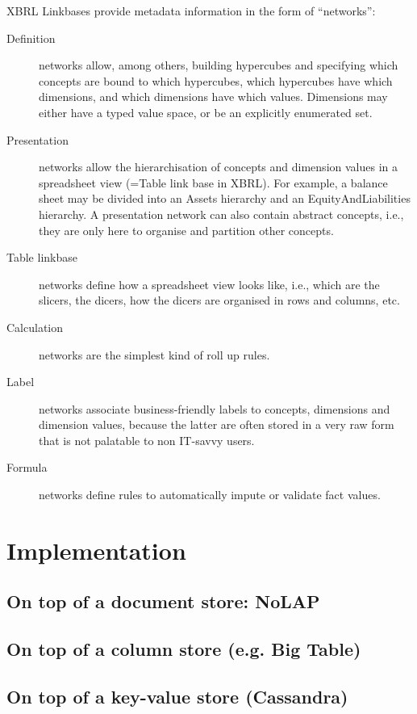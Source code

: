 \documentclass{vldb}
\begin{document}
XBRL Linkbases provide metadata information in the form of ``networks'':

\begin{description}
\item[Definition] networks allow, among others, building hypercubes and specifying which concepts are bound to which hypercubes, which hypercubes have which dimensions, and which dimensions have which values. Dimensions may either have a typed value space, or be an explicitly enumerated set. 
\item[Presentation] networks allow the hierarchisation of concepts and dimension values in a spreadsheet view (=Table link base in XBRL). For example, a balance sheet may be divided into an Assets hierarchy and an EquityAndLiabilities hierarchy. A presentation network can also contain abstract concepts, i.e., they are only here to organise and partition other concepts. 
\item[Table linkbase] networks define how a spreadsheet view looks like, i.e., which are the slicers, the dicers, how the dicers are organised in rows and columns, etc.
\item[Calculation] networks are the simplest kind of roll up rules.
\item[Label] networks associate business-friendly labels to concepts, dimensions and dimension values, because the latter are often stored in a very raw form that is not palatable to non IT-savvy users.
\item[Formula] networks define rules to automatically impute or validate fact values.
\end{description}

\section{Implementation}

\subsection{On top of a document store: NoLAP}

\subsection{On top of a column store (e.g. Big Table)}

\subsection{On top of a key-value store (Cassandra)}
\end{document}
